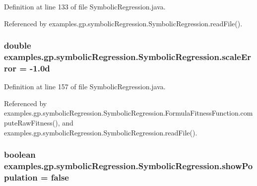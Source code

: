 Definition at line 133 of file Symbolic\-Regression.\-java.



Referenced by examples.\-gp.\-symbolic\-Regression.\-Symbolic\-Regression.\-read\-File().

\hypertarget{classexamples_1_1gp_1_1symbolic_regression_1_1_symbolic_regression_a2211f414599fe21341db16918a44edb6}{
\subsubsection[{scale\-Error}]{\setlength{\rightskip}{0pt plus 5cm}double examples.\-gp.\-symbolic\-Regression.\-Symbolic\-Regression.\-scale\-Error = -\/1.\-0d\hspace{0.3cm}{\ttfamily [static]}}}\label{classexamples_1_1gp_1_1symbolic_regression_1_1_symbolic_regression_a2211f414599fe21341db16918a44edb6}


Definition at line 157 of file Symbolic\-Regression.\-java.



Referenced by examples.\-gp.\-symbolic\-Regression.\-Symbolic\-Regression.\-Formula\-Fitness\-Function.\-compute\-Raw\-Fitness(), and examples.\-gp.\-symbolic\-Regression.\-Symbolic\-Regression.\-read\-File().

\hypertarget{classexamples_1_1gp_1_1symbolic_regression_1_1_symbolic_regression_a3fe3b5aec221fd8f8e8a45d5d525367b}{
\subsubsection[{show\-Population}]{\setlength{\rightskip}{0pt plus 5cm}boolean examples.\-gp.\-symbolic\-Regression.\-Symbolic\-Regression.\-show\-Population = false\hspace{0.3cm}{\ttfamily [static]}}}\label{classexamples_1_1gp_1_1symbolic_regression_1_1_symbolic_regression_a3fe3b5aec221fd8f8e8a45d5d525367b}


